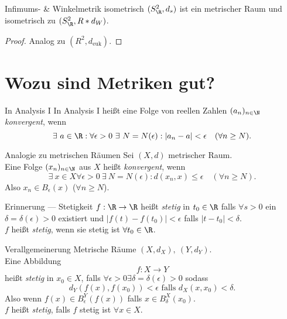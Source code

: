 \begin{theorem}{Infimums- \& Winkelmetrik isometrisch}
  $ (S^2_\R, d_s) $ ist ein metrischer Raum und isometrisch zu $ (S^2_\R, R*d_W) $.
  \begin{proof}
    Analog zu $ (R^2, d_\text{euk}) $.
  \end{proof}
\end{theorem}

\section{Wozu sind Metriken gut?}

\begin{bla}{In Analysis I}
  In Analysis I heißt eine Folge von reellen Zahlen $ (a_n)_{n \in \N} $ \emph{konvergent}, wenn
  \begin{equation*}
    \exists \ a \in \R : \forall \epsilon > 0 \ \exists \ N = N(\epsilon) : \vert a_n - a \vert < \epsilon \quad (\forall n \geq N)\text{.}
  \end{equation*}
\end{bla}

\begin{bla}{Analogie zu metrischen Räumen}
  Sei $ (X, d) $ metrischer Raum. \\
  Eine Folge $ (x_n)_{n \in \N} $ aus $ X $ heißt \emph{konvergent}, wenn
  \begin{equation*}
    \exists \ x \in X \forall \epsilon > 0 \ \exists \ N = N(\epsilon) : d(x_n, x) \leq \epsilon \quad (\forall n \geq N)\text{.}
  \end{equation*}
  Also $ x_n \in B_\epsilon(x) $ ($ \forall n \geq N $).
\end{bla}

\begin{bla}{Erinnerung --- Stetigkeit}
  $ f: \R \to \R $ heißt \emph{stetig} in $ t_0 \in \R $ falls $ \forall s > 0 $ ein $ \delta = \delta(\epsilon) > 0 $ existiert und $ \vert f(t)-f(t_0) \vert < \epsilon $ falls $ \vert t - t_0 \vert < \delta $. \\
  $ f $ heißt \emph{stetig}, wenn sie stetig ist $ \forall t_0 \in \R $.
\end{bla}

\begin{bla}{Verallgemeinerung}
  Metrische Räume $ (X, d_X), \ (Y, d_Y) $. \\
  Eine Abbildung
  \begin{equation*}
    f: X \to Y
  \end{equation*}
  heißt \emph{stetig} in $ x_0 \in X $, falls $ \forall \epsilon > 0 \exists \delta = \delta(\epsilon) > 0 $ sodass
  \begin{equation*}
    d_Y(f(x), f(x_0)) < \epsilon \text{ falls } d_X(x, x_0) < \delta\text{.}
  \end{equation*}
  Also wenn $ f(x) \in B_\epsilon^Y(f(x)) $ falls $ x \in B_\delta^X(x_0) $. \\
  $ f $ heißt \emph{stetig}, falls $ f $ stetig ist $ \forall x \in X $.
\end{bla}

